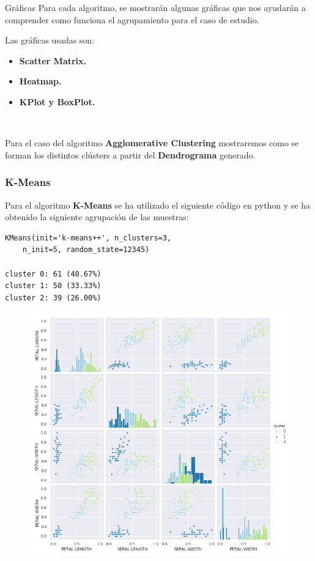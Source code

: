 \documentclass[spanish]{beamer}
\begin{document}
\begin{frame}{Gráficas}
Para cada algoritmo, se mostrarán algunas gráficas que nos ayudarán a comprender como funciona el agrupamiento para el caso de estudio.\break

Las gráficas usadas son: 
\begin{itemize}
\item \textbf{Scatter Matrix.}
\item \textbf{Heatmap.}
\item \textbf{KPlot y BoxPlot.}
\end{itemize}\

Para el caso del algoritmo \textbf{Agglomerative Clustering} mostraremos como se forman los distintos clústers a partir del \textbf{Dendrograma} generado.
\end{frame}

\begin{frame}[fragile]
\frametitle{K-Means}
Para el algoritmo \textbf{K-Means} se ha utilizado el siguiente código en python y se ha obtenido la siguiente agrupación de las muestras:\break
\begin{lstlisting}
KMeans(init='k-means++', n_clusters=3, 
	n_init=5, random_state=12345)

cluster 0: 61 (40.67%)
cluster 1: 50 (33.33%)
cluster 2: 39 (26.00%)
\end{lstlisting}
\end{frame}

\begin{frame}
\begin{figure}[h]
\centering
\includegraphics[scale=0.34]{dani/scatmatrixK-MeansIRIS.png}
\end{figure}
\end{frame}
\end{document}
